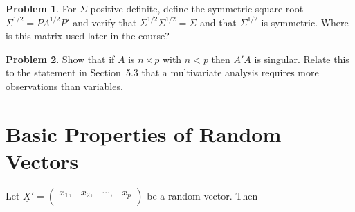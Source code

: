 \documentclass[11pt,a4paper]{article}
\theoremstyle{definition}
\newtheorem{problemx}{Problem}[section]
\newenvironment{problem}{\begin{problemx}}{\end{problemx}}
\begin{document}
\begin{problem}
For $\Sigma$ positive definite, define the symmetric square root
$\Sigma^{1/2} = P\Lambda^{1/2}P'$ and verify that
$\Sigma^{1/2}\Sigma^{1/2}=\Sigma$ and that $\Sigma^{1/2}$ is symmetric. Where is
this matrix used later in the course?
\end{problem}

\begin{problem}
Show that if $A$ is $n\times p$ with $n<p$ then $A'A$ is singular. Relate this
to the statement in Section~5.3 that a multivariate analysis requires more
observations than variables.
\end{problem}

\section{Basic Properties of Random Vectors}
Let $\underline{X}'=\begin{pmatrix}
x_1, & x_2, & \cdots, & x_p\\
\end{pmatrix}
$ be a random vector. Then
\end{document}

